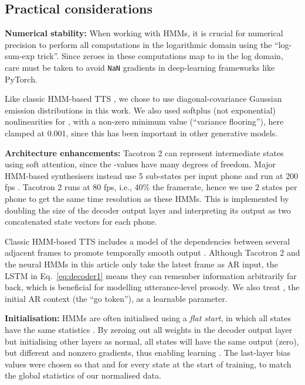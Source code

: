 \documentclass[british]{article}
\begin{document}
\subsection{Practical considerations}
\label{ssec:implementation}
\textbf{Numerical stability:}
When working with HMMs, it is crucial for numerical precision to perform all computations in the logarithmic domain
using the ``log-sum-exp trick''.
Since zeroes in these computations map to  in the log domain,
care must be taken
to avoid \texttt{NaN} gradients in deep-learning frameworks like PyTorch.


Like classic HMM-based TTS \cite{zen2009statistical}, we chose to use diagonal-covariance Gaussian emission distributions  in this work.
We also used softplus (not exponential) nonlinearities for , with a non-zero minimum value (``variance flooring''), here clamped at 0.001, since this has been important in other generative models.


\textbf{Architecture enhancements:}
Tacotron 2 can represent intermediate states using soft attention, since the -values have many degrees of freedom.
Major HMM-based synthesisers instead use 5 sub-states per input phone and run at 200 fps \cite{zen2009statistical,wu2016merlin}.
Tacotron 2 runs at 80 fps, i.e., 40\% the framerate, hence we use 2 states per phone to get the same time resolution as these HMMs.
This is implemented by doubling the size of the decoder output layer and interpreting its output as two concatenated state vectors  for each phone.


Classic HMM-based TTS
includes a model of the dependencies between several adjacent frames to promote temporally smooth output \cite{zen2009statistical,shannon2013autoregressive,wu2016merlin}.
Although Tacotron 2 and the neural HMMs in this article only take the latest frame  as AR input, the LSTM in Eq.\ \eqref{eq:decoder1} means they can remember information arbitrarily far back,
which is beneficial for modelling utterance-level prosody.
We also treat , the initial AR context (the ``go token''), as a learnable parameter.

\textbf{Initialisation:}
HMMs are often initialised using a \emph{flat start}, in which all states have the same statistics \cite{young2002htk}.
By zeroing out all weights in the decoder output layer but initialising other layers as normal, all states will have the same output (zero), but different and nonzero gradients, thus enabling learning \cite{zhang2019fixup}.
The last-layer bias values were chosen so that  and  for every state at the start of training, to match the global statistics of our normalised data.
\end{document}
